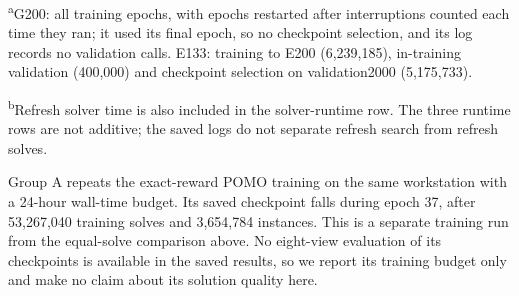 \documentclass[preprint,12pt,authoryear]{elsarticle}
\DeclareRobustCommand{\zhcap}[1]{{\color{zhc}#1}}
\begin{document}
\begin{table}[!htbp]
\centering
\caption{Training budgets of G200 and E133.\protect\newline\zhcap{G200 与 E133 的训练预算。}}
\label{tab:budget}
\small
{}
\par\smallskip\footnotesize\raggedright \textsuperscript{a}G200: all training epochs, with epochs restarted after interruptions counted each time they ran; it used its final epoch, so no checkpoint selection, and its log records no validation calls. E133: training to E200 (6,239,185), in-training validation (400,000) and checkpoint selection on validation2000 (5,175,733).
\par \textsuperscript{b}Refresh solver time is also included in the solver-runtime row. The three runtime rows are not additive; the saved logs do not separate refresh search from refresh solves.
\end{table}

Group A repeats the exact-reward POMO training on the same workstation with a 24-hour wall-time budget. Its saved checkpoint falls during epoch 37, after 53,267,040 training solves and 3,654,784 instances. This is a separate training run from the equal-solve comparison above. No eight-view evaluation of its checkpoints is available in the saved results, so we report its training budget only and make no claim about its solution quality here.
\end{document}
